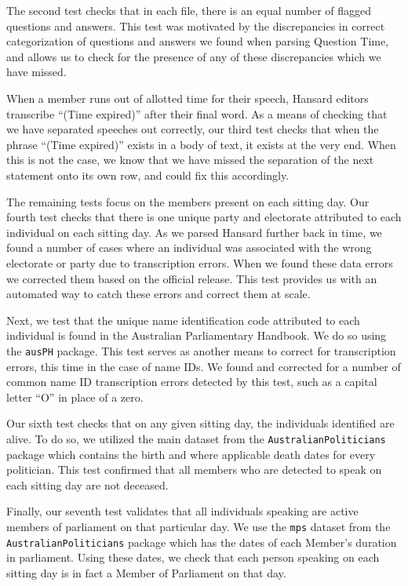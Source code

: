 \documentclass[
  letterpaper,
  DIV=11,
  numbers=noendperiod]{scrartcl}
\begin{document}
The second test checks that in each file, there is an equal number of
flagged questions and answers. This test was motivated by the
discrepancies in correct categorization of questions and answers we
found when parsing Question Time, and allows us to check for the
presence of any of these discrepancies which we have missed.

When a member runs out of allotted time for their speech, Hansard
editors transcribe ``(Time expired)'' after their final word. As a means
of checking that we have separated speeches out correctly, our third
test checks that when the phrase ``(Time expired)'' exists in a body of
text, it exists at the very end. When this is not the case, we know that
we have missed the separation of the next statement onto its own row,
and could fix this accordingly.

The remaining tests focus on the members present on each sitting day.
Our fourth test checks that there is one unique party and electorate
attributed to each individual on each sitting day. As we parsed Hansard
further back in time, we found a number of cases where an individual was
associated with the wrong electorate or party due to transcription
errors. When we found these data errors we corrected them based on the
official release. This test provides us with an automated way to catch
these errors and correct them at scale.

Next, we test that the unique name identification code attributed to
each individual is found in the Australian Parliamentary Handbook. We do
so using the \texttt{ausPH} package. This test serves as another means
to correct for transcription errors, this time in the case of name IDs.
We found and corrected for a number of common name ID transcription
errors detected by this test, such as a capital letter ``O'' in place of
a zero.

Our sixth test checks that on any given sitting day, the individuals
identified are alive. To do so, we utilized the main dataset from the
\texttt{AustralianPoliticians} package which contains the birth and
where applicable death dates for every politician. This test confirmed
that all members who are detected to speak on each sitting day are not
deceased.

Finally, our seventh test validates that all individuals speaking are
active members of parliament on that particular day. We use the
\texttt{mps} dataset from the \texttt{AustralianPoliticians} package
which has the dates of each Member's duration in parliament. Using these
dates, we check that each person speaking on each sitting day is in fact
a Member of Parliament on that day.
\end{document}
